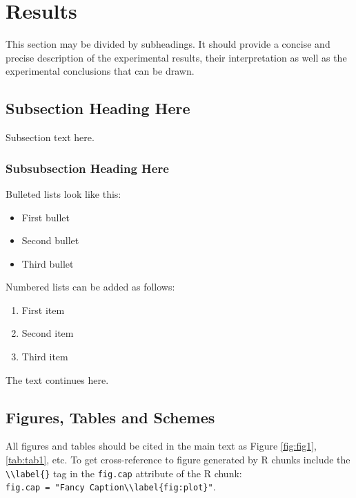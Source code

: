\documentclass[
]{article}
\providecommand{\tightlist}{%
  \setlength{\itemsep}{0pt}\setlength{\parskip}{0pt}}
\begin{document}
\hypertarget{results}{%
\section{Results}\label{results}}

This section may be divided by subheadings. It should provide a concise and
precise description of the experimental results, their interpretation as well
as the experimental conclusions that can be drawn.

\hypertarget{subsection-heading-here}{%
\subsection{Subsection Heading Here}\label{subsection-heading-here}}

Subsection text here.

\hypertarget{subsubsection-heading-here}{%
\subsubsection{Subsubsection Heading Here}\label{subsubsection-heading-here}}

Bulleted lists look like this:

\begin{itemize}
\tightlist
\item
  First bullet
\item
  Second bullet
\item
  Third bullet
\end{itemize}

Numbered lists can be added as follows:

\begin{enumerate}
\def\labelenumi{\arabic{enumi}.}
\tightlist
\item
  First item
\item
  Second item
\item
  Third item
\end{enumerate}

The text continues here.

\hypertarget{figures-tables-and-schemes}{%
\subsection{Figures, Tables and Schemes}\label{figures-tables-and-schemes}}

All figures and tables should be cited in the main text as Figure \ref{fig:fig1},
\ref{tab:tab1}, etc. To get cross-reference to figure generated by R chunks
include the \texttt{\textbackslash{}\textbackslash{}label\{\}} tag in the \texttt{fig.cap} attribute of the R chunk:
\texttt{fig.cap\ =\ "Fancy\ Caption\textbackslash{}\textbackslash{}label\{fig:plot\}"}.
\end{document}
